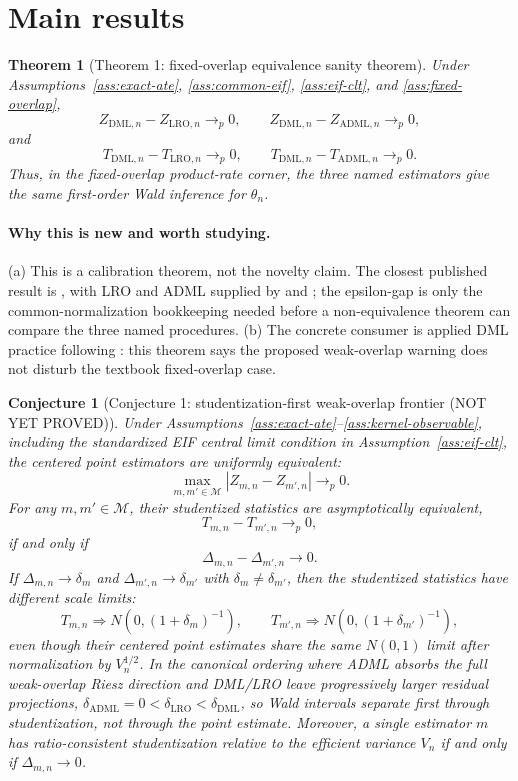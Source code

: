 \documentclass[11pt]{article}
\theoremstyle{definition}
\theoremstyle{plain}
\newtheorem{theorem}{Theorem}
\newtheorem{conjecture}{Conjecture}
\theoremstyle{remark}
\begin{document}
\section{Main results}
\begin{theorem}[Theorem 1: fixed-overlap equivalence sanity theorem]\label{thm:fixed-overlap}
Under Assumptions~\ref{ass:exact-ate}, \ref{ass:common-eif}, \ref{ass:eif-clt}, and \ref{ass:fixed-overlap},
\[
  Z_{\mathrm{DML},n}-Z_{\mathrm{LRO},n}\to_p0,\qquad
  Z_{\mathrm{DML},n}-Z_{\mathrm{ADML},n}\to_p0,
\]
and
\[
  T_{\mathrm{DML},n}-T_{\mathrm{LRO},n}\to_p0,\qquad
  T_{\mathrm{DML},n}-T_{\mathrm{ADML},n}\to_p0.
\]
Thus, in the fixed-overlap product-rate corner, the three named estimators give the same first-order Wald inference for \(\theta_n\).
\end{theorem}
\paragraph{Why this is new and worth studying.}
(a) This is a calibration theorem, not the novelty claim.  The closest published result is \citet{ChernozhukovEtAl2018DML}, with LRO and ADML supplied by \citet{ChernozhukovEscancianoIchimuraNeweyRobins2022LRO} and \citet{ChernozhukovNeweySingh2022ADML}; the epsilon-gap is only the common-normalization bookkeeping needed before a non-equivalence theorem can compare the three named procedures.  (b) The concrete consumer is applied DML practice following \citet{ChernozhukovEtAl2018DML}: this theorem says the proposed weak-overlap warning does not disturb the textbook fixed-overlap case.

\begin{conjecture}[Conjecture 1: studentization-first weak-overlap frontier (NOT YET PROVED)]\label{conj:student-frontier}
Under Assumptions~\ref{ass:exact-ate}--\ref{ass:kernel-observable}, including the standardized EIF central limit condition in Assumption~\ref{ass:eif-clt}, the centered point estimators are uniformly equivalent:
\[
  \max_{m,m'\in\mathcal M}|Z_{m,n}-Z_{m',n}|\to_p0.
\]
For any \(m,m'\in\mathcal M\), their studentized statistics are asymptotically equivalent,
\[
  T_{m,n}-T_{m',n}\to_p0,
\]
if and only if
\[
  \Delta_{m,n}-\Delta_{m',n}\to0.
\]
If \(\Delta_{m,n}\to\delta_m\) and \(\Delta_{m',n}\to\delta_{m'}\) with \(\delta_m\ne\delta_{m'}\), then the studentized statistics have different scale limits:
\[
  T_{m,n}\Rightarrow N(0,(1+\delta_m)^{-1}),\qquad
  T_{m',n}\Rightarrow N(0,(1+\delta_{m'})^{-1}),
\]
even though their centered point estimates share the same \(N(0,1)\) limit after normalization by \(V_n^{1/2}\).  In the canonical ordering where ADML absorbs the full weak-overlap Riesz direction and DML/LRO leave progressively larger residual projections, \(\delta_{\mathrm{ADML}}=0<\delta_{\mathrm{LRO}}<\delta_{\mathrm{DML}}\), so Wald intervals separate first through studentization, not through the point estimate.  Moreover, a single estimator \(m\) has ratio-consistent studentization relative to the efficient variance \(V_n\) if and only if \(\Delta_{m,n}\to0\).
\end{conjecture}
\end{document}
